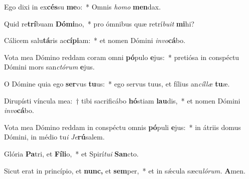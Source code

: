 \item Ego dixi in ex\textbf{cés}su \textbf{me}o:~* Omnis \textit{homo} \textbf{men}dax.
\item Quid re\textbf{trí}buam \textbf{Dó}\textbf{mi}no,~* pro ómnibus quæ retrí\textit{buit} \textbf{mi}hi?
\item Cálicem salu\textbf{tá}ris ac\textbf{cí}\textbf{pi}am:~* et nomen Dómini \textit{invo}\textbf{cá}bo.
\item Vota mea Dómino reddam coram omni \textbf{pó}pulo \textbf{e}jus:~* pretiósa in conspé\-ctu Dómini mors san\textit{ctórum} \textbf{e}jus.
\item O Dómine quia ego \textbf{ser}vus \textbf{tu}us:~* ego servus tuus, et fílius an\textit{cíllæ} \textbf{tu}æ.
\item Dirupísti víncula mea:~† tibi sacrificábo \textbf{hó}stiam \textbf{lau}dis,~* et nomen Dómini \textit{invo}\textbf{cá}bo.
\item Vota mea Dómino reddam in conspéctu omnis \textbf{pó}puli \textbf{e}jus:~* in átriis domus Dómini, in médio tu\hspace{0.03em}\textit{i} \textit{Je}\textbf{rú}salem.
\item Glória \textbf{Pa}tri, et \textbf{Fí}\textbf{li}o,~* et Spirí\hspace{0.03em}\textit{tui} \textbf{San}cto.
\item Sicut erat in princípio, et \textbf{nunc,} et \textbf{sem}per,~* et in sǽcula sæcu\hspace{0.03em}\textit{lórum.} \textbf{A}men.